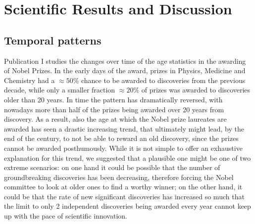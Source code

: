 \chapter{Scientific Results and Discussion} \label{Results and Discussion}

\section{Temporal patterns}

Publication I studies the changes over time of the age statistics in the awarding of Nobel Prizes. In the early days of the award, prizes in Physics, Medicine and Chemistry had
a $\approx 50\% $ chance to be awarded to discoveries from the previous decade, while only a smaller fraction $\approx 20\%$ of prizes was awarded to discoveries older than 20 years. In time
the pattern has dramatically reversed, with nowadays more than half of the prizes being awarded over 20 years from discovery. As a result, also the age at which the Nobel prize
laureates are awarded has seen a drastic increasing trend, that ultimately might lead, by the end of the century, to not be able to reward an old discovery, since the prizes cannot
be awarded posthumously. While it is not simple to offer an exhaustive explanation for this trend, we suggested that a plausible one might be one of two extreme scenarios:
on one hand it could be possible that the number of groundbreaking discoveries has been decreasing, therefore forcing the Nobel committee to look at older ones to find a worthy winner;
on the other hand, it could be that the rate of new significant discoveries has increased so much that the limit to only 2 independent discoveries being awarded every year cannot
keep up with the pace of scientific innovation. 

